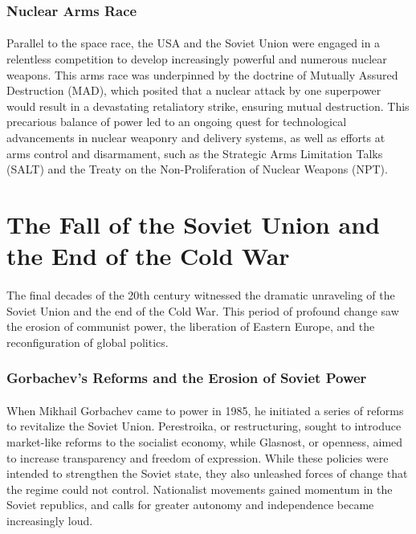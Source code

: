 \documentclass{book}
\begin{document}
\subsubsection*{Nuclear Arms Race}
\paragraph{}
Parallel to the space race, the USA and the Soviet Union were engaged in a relentless competition to develop increasingly powerful and numerous nuclear weapons. This arms race was underpinned by the doctrine of Mutually Assured Destruction (MAD), which posited that a nuclear attack by one superpower would result in a devastating retaliatory strike, ensuring mutual destruction. This precarious balance of power led to an ongoing quest for technological advancements in nuclear weaponry and delivery systems, as well as efforts at arms control and disarmament, such as the Strategic Arms Limitation Talks (SALT) and the Treaty on the Non-Proliferation of Nuclear Weapons (NPT). 

\section*{The Fall of the Soviet Union and the End of the Cold War}
\paragraph{}
The final decades of the 20th century witnessed the dramatic unraveling of the Soviet Union and the end of the Cold War. This period of profound change saw the erosion of communist power, the liberation of Eastern Europe, and the reconfiguration of global politics. 

\subsubsection*{Gorbachev’s Reforms and the Erosion of Soviet Power}
\paragraph{}
When Mikhail Gorbachev came to power in 1985, he initiated a series of reforms to revitalize the Soviet Union. Perestroika, or restructuring, sought to introduce market-like reforms to the socialist economy, while Glasnost, or openness, aimed to increase transparency and freedom of expression. While these policies were intended to strengthen the Soviet state, they also unleashed forces of change that the regime could not control. Nationalist movements gained momentum in the Soviet republics, and calls for greater autonomy and independence became increasingly loud. 
\end{document}

